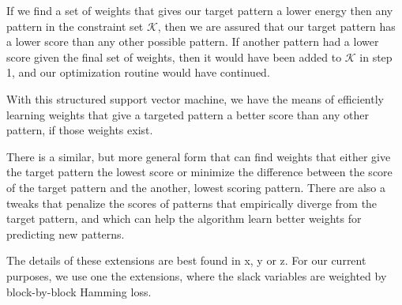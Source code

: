 If we find a set of weights that gives our target pattern a lower
energy then any pattern in the constraint set $\mathcal{K}$, then we
are assured that our target pattern has a lower score than any other
possible pattern. If another pattern had a lower score given the final
set of weights, then it would have been added to $\mathcal{K}$ in step
1, and our optimization routine would have continued. 

With this structured support vector machine, we have the means of
efficiently learning weights that give a targeted pattern a better
score than any other pattern, if those weights exist. 

There is a similar, but more general form that can find weights that
either give the target pattern the lowest score or minimize the
difference between the score of the target pattern and the another,
lowest scoring pattern. There are also a tweaks that penalize the
scores of patterns that empirically diverge from the target pattern,
and which can help the algorithm learn better weights for predicting
new patterns.

The details of these extensions are best found in x, y or z. For our
current purposes, we use one the extensions, where the slack variables
are weighted by block-by-block Hamming loss.

